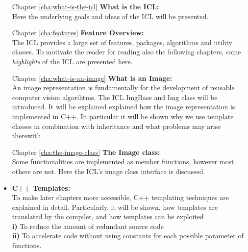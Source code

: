 \begin{itemize}
\item [Chapter \ref{cha:what-is-the-icl}] \textbf{What is the ICL:}\\ Here the underlying goals and ideas of the ICL will be presented.
\item [Chapter \ref{cha:features}] \textbf{Feature Overview:}\\ The ICL provides a large set of features, packages, algorithms and utility classes. To motivate the reader for reading also the following chapters, some \emph{highlights} of the ICL are presented here.
\item [Chapter \ref{cha:what-is-an-image}] \textbf{What is an Image:}\\ An image representation is fundamentally for the development of reusable computer vision algorihtms. The ICL ImgBase  and Img  class will be introduced. It will be explained explained how the image representation is implemented in C++. In particular it will be shown why we use template classes in combination with inheritance and what problems may arise therewith. 
\item [Chapter \ref{cha:the-image-class}]\textbf{The Image class:}\\ Some functionalities are implemented as member functions, however most others are not. Here the ICL's image class interface   is discussed.
\item \textbf{C++ Templates:}\\ To make later chapters more accessible, C++ templating techniques are explained in detail. Particularly, it will be shown, how templates are translated by the compiler, and how templates can be exploited\\
\small{\textbf{i)}} To reduce the amount of redundant source code\\
\small{\textbf{ii)}} To accelerate code without using constants for each possible parameter of functions.    


\end{itemize}

